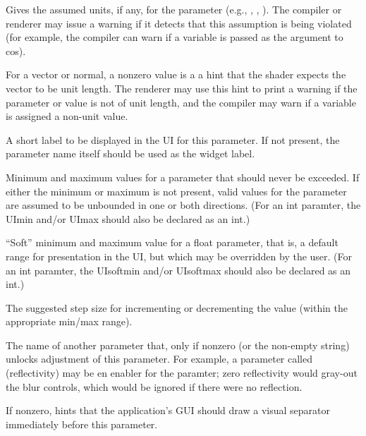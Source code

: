 \documentclass[11pt,letterpaper]{book}
\def\float{{\cf float}\xspace}
\def\normal{{\cf normal}\xspace}
\def\vector{{\cf vector}\xspace}
\begin{document}
\NEW %
Gives the assumed units, if any, for the parameter (e.g., ,
, ).
The compiler or renderer may issue a warning if it detects that this
assumption is being violated (for example, the compiler can warn
if a  variable is passed as the argument to {\cf cos}).
\apiend

\NEW %
For a \vector or \normal, a nonzero value is a a hint that the shader
expects the vector to be unit length.  The renderer may use this hint to
print a warning if the parameter or value is not of unit length, and the
compiler may warn if a  variable is assigned a non-unit
value.
\apiend

A short label to be displayed in the UI for this parameter.  If not
present, the parameter name itself should be used as the widget label.
\apiend

Minimum and maximum values for a parameter that should never be
exceeded.  If either the minimum or maximum is not present, valid values
for the parameter are assumed to be unbounded in one or both directions.
(For an {\cf int} paramter, the {\cf UImin} and/or {\cf UImax} should
also be declared as an {\cf int}.)
\apiend

``Soft'' minimum and maximum value for a \float parameter, that is, a
default range for presentation in the UI, but which may be overridden by
the user. (For an {\cf int} paramter, the {\cf UIsoftmin} and/or {\cf
  UIsoftmax} should also be declared as an {\cf int}.)
\apiend

The suggested step size for incrementing or decrementing the value
(within the appropriate min/max range).
\apiend

The name of another parameter that, only if nonzero (or the
non-empty string) unlocks adjustment of this parameter.  For example,
a parameter called  (reflectivity) may be en enabler for
the  paramter; zero reflectivity would gray-out
the blur controls, which would be ignored if there were no reflection.
\apiend

If nonzero, hints that the application's GUI should draw a visual 
separator immediately before this parameter.
\apiend
\end{document}
